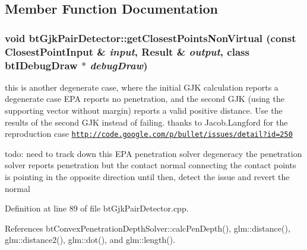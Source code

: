\subsection{Member Function Documentation}
\hypertarget{classbt_gjk_pair_detector_bc29953dd7aee59e9ca887963c26c8c2}{
\subsubsection[getClosestPointsNonVirtual]{\setlength{\rightskip}{0pt plus 5cm}void btGjkPairDetector::getClosestPointsNonVirtual (const ClosestPointInput \& {\em input}, \/  Result \& {\em output}, \/  class {\bf btIDebugDraw} $\ast$ {\em debugDraw})}}
\label{classbt_gjk_pair_detector_bc29953dd7aee59e9ca887963c26c8c2}




this is another degenerate case, where the initial GJK calculation reports a degenerate case EPA reports no penetration, and the second GJK (using the supporting vector without margin) reports a valid positive distance. Use the results of the second GJK instead of failing. thanks to Jacob.Langford for the reproduction case \href{http://code.google.com/p/bullet/issues/detail?id=250}{\tt http://code.google.com/p/bullet/issues/detail?id=250}

todo: need to track down this EPA penetration solver degeneracy the penetration solver reports penetration but the contact normal connecting the contact points is pointing in the opposite direction until then, detect the issue and revert the normal 

Definition at line 89 of file btGjkPairDetector.cpp.

References btConvexPenetrationDepthSolver::calcPenDepth(), glm::distance(), glm::distance2(), glm::dot(), and glm::length().


